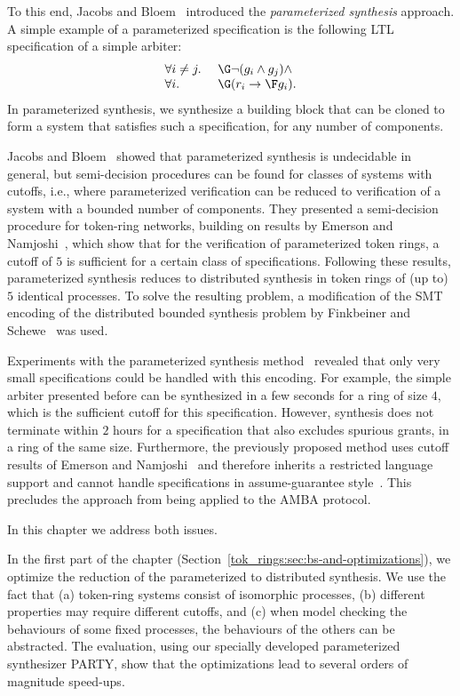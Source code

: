 To this end, Jacobs and Bloem~\cite{JB14} introduced the 
\emph{parameterized synthesis} approach.
A simple example of a parameterized specification is the following LTL specification of a simple arbiter:
\[ \begin{array}{ll}
  \forall i \neq j.~ & \G \neg ( g_i \land g_j ) \land \\
  \forall i.~ & \G (r_i \impl \F g_i).
  \end{array}
\]
In parameterized synthesis, we synthesize a building block that can be cloned to form a system that satisfies such a specification, for any number of components.

Jacobs and Bloem~\cite{JB14} showed that parameterized synthesis is undecidable in general, but semi-decision procedures can be found for classes of systems with cutoffs, i.e., where parameterized verification can be reduced to verification of a system with a bounded number of components. They presented a semi-decision procedure for token-ring networks, building on results by Emerson and Namjoshi~\cite{Emerso03}, which show that for the verification of parameterized token rings, a cutoff of $5$ is sufficient for a certain class of specifications. Following these results, parameterized synthesis reduces to distributed synthesis in token rings of (up to) $5$ identical processes. To solve the resulting problem, a modification of the SMT encoding of the distributed bounded synthesis problem by Finkbeiner and Schewe~\cite{BS} was used.

Experiments with the parameterized synthesis method~\cite{JB14} revealed that only very small specifications could be handled with this encoding. For example, the simple arbiter presented before can be synthesized in a few seconds for a ring of size $4$, which is the sufficient cutoff for this specification. However, synthesis does not terminate within $2$ hours for a specification that also excludes spurious grants, in a ring of the same size. Furthermore, the previously proposed method uses cutoff results of Emerson and Namjoshi~\cite{Emerso03} and therefore inherits a restricted language support and cannot handle specifications in assume-guarantee style~\cite{Bloem12}.
This precludes the approach from being applied to the AMBA protocol.

In this chapter we address both issues.

In the first part of the chapter (Section~\ref{tok_rings:sec:bs-and-optimizations}),
we optimize the reduction of the parameterized to distributed synthesis.
We use the fact that
(a) token-ring systems consist of isomorphic processes,
(b) different properties may require different cutoffs, and
(c) when model checking the behaviours of some fixed processes,
    the behaviours of the others can be abstracted.
The evaluation,
using our specially developed parameterized synthesizer PARTY,
show that the optimizations lead to several orders of magnitude speed-ups.
 
